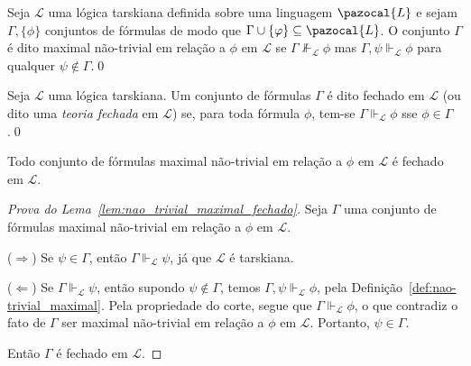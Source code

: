     \begin{definicao}\label{def:nao-trivial_maximal}
        Seja $\mathcal{L}$ uma lógica tarskiana definida sobre uma linguagem $\pazocal{L}$ e sejam $\Gamma, \{\phi\}$ conjuntos de fórmulas de modo que $\Gamma \cup \{\phi\} \subseteq \pazocal{L}$. O conjunto $\Gamma$ é dito maximal não-trivial em relação a $\phi$ em $\mathcal{L}$ se $\Gamma \nVdash_{\mathcal{L}} \phi$ mas $\Gamma, \psi \Vdash_{\mathcal{L}} \phi$ para qualquer $\psi \notin \Gamma$.\qed{}
    \end{definicao}

    \begin{definicao}\label{def:fechada}

        Seja $\mathcal{L}$ uma lógica tarskiana. Um conjunto de fórmulas $\Gamma$ é dito fechado em $\mathcal{L}$ (ou dito uma \textit{teoria fechada} em $\mathcal{L}$) se, para toda fórmula $\phi$, tem-se $\Gamma \Vdash_{\mathcal{L}} \phi$ sse $\phi \in \Gamma$.\qed{}
    \end{definicao}

    \begin{lema}\label{lem:nao_trivial_maximal_fechado}
        Todo conjunto de fórmulas maximal não-trivial em relação a $\phi$ em $\mathcal{L}$ é fechado em $\mathcal{L}$.
    \end{lema}

    \begin{proof}[Prova do Lema~\ref{lem:nao_trivial_maximal_fechado}]
        Seja $\Gamma$ uma conjunto de fórmulas maximal não-trivial em relação a $\phi$ em $\mathcal{L}$. 
        
        \noindent($\Longrightarrow$) Se $\psi \in \Gamma$, então $\Gamma \Vdash_{\mathcal{L}} \psi$, já que $\mathcal{L}$ é tarskiana. 
        
        \noindent($\Longleftarrow$) Se $\Gamma \Vdash_{\mathcal{L}} \psi$, então supondo $\psi \notin \Gamma$, temos $\Gamma, \psi \Vdash_{\mathcal{L}} \phi$, pela Definição~\ref{def:nao-trivial_maximal}. Pela propriedade do corte, segue que $\Gamma \Vdash_{\mathcal{L}} \phi$, o que contradiz o fato de $\Gamma$ ser maximal não-trivial em relação a $\phi$ em $\mathcal{L}$. Portanto, $\psi \in \Gamma$.
        
        Então $\Gamma$ é fechado em $\mathcal{L}$.
    \end{proof}





